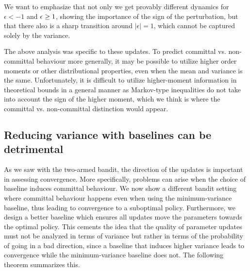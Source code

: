 We want to emphasize that not only we get provably different dynamics for $\epsilon < -1$ and ${\epsilon} \ge 1$, showing the importance of the sign of the perturbation, but that there also is a sharp transition around $|\epsilon| = 1$, which cannot be captured solely by the variance.

The above analysis was specific to these updates. To predict committal vs. non-committal behaviour more generally, it may be possible to utilize higher order moments or other distributional properties, even when the mean and variance is the same.
Unfortunately, it is difficult to utilize higher-moment information in theoretical bounds in a general manner as Markov-type inequalities do not take into account the sign of the higher moment, which we think is where the committal vs. non-committal distinction would appear.




\subsection{Reducing variance with baselines can be detrimental}
\label{sec:reducing_detrimental}
As we saw with the two-armed bandit, the direction of the updates is important in assessing convergence. More specifically, problems can arise when the choice of baseline induces committal behaviour.
We now show a different bandit setting where committal behaviour happens even when using the minimum-variance baseline, thus leading to convergence to a suboptimal policy. Furthermore, we design a better baseline which ensures all updates move the parameters towards the optimal policy. This cements the idea that the quality of parameter updates must not be analyzed in terms of variance but rather in terms of the probability of going in a bad direction, since a baseline that induces higher variance leads to convergence while the minimum-variance baseline does not.
The following theorem summarizes this.


